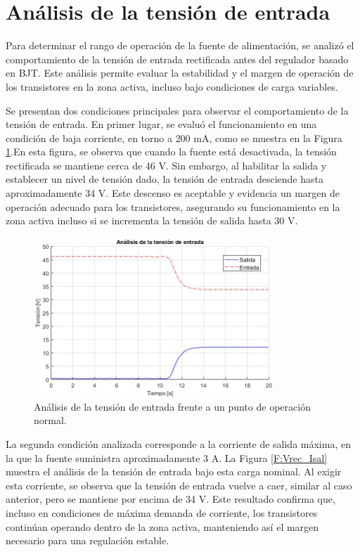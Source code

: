 \section{Análisis de la tensión de entrada}
Para determinar el rango de operación de la fuente de alimentación, se analizó el comportamiento de la tensión de entrada rectificada antes del regulador basado en BJT. Este análisis permite evaluar la estabilidad y el margen de operación de los transistores en la zona activa, incluso bajo condiciones de carga variables. \par

Se presentan dos condiciones principales para observar el comportamiento de la tensión de entrada. En primer lugar, se evaluó el funcionamiento en una condición de baja corriente, en torno a 200 mA, como se muestra en la Figura \ref{F:Tension_entrada_12}.En esta figura, se observa que cuando la fuente está desactivada, la tensión rectificada se mantiene cerca de 46 V. Sin embargo, al habilitar la salida y establecer un nivel de tensión dado, la tensión de entrada desciende hasta aproximadamente 34 V. Este descenso es aceptable y evidencia un margen de operación adecuado para los transistores, asegurando su funcionamiento en la zona activa incluso si se incrementa la tensión de salida hasta 30 V. \par

\begin{figure}[htbp]
    \centering
    \includegraphics[width=0.8\textwidth]{./imagenes/Tension_12.jpg}
    \caption{Análisis de la tensión de entrada frente a un punto de operación normal.}
    \label{F:Tension_entrada_12}
\end{figure}\par

La segunda condición analizada corresponde a la corriente de salida máxima, en la que la fuente suministra aproximadamente 3 A. La Figura \ref{F:Vrec_Isal} muestra el análisis de la tensión de entrada bajo esta carga nominal. Al exigir esta corriente, se observa que la tensión de entrada vuelve a caer, similar al caso anterior, pero se mantiene por encima de 34 V. Este resultado confirma que, incluso en condiciones de máxima demanda de corriente, los transistores continúan operando dentro de la zona activa, manteniendo así el margen necesario para una regulación estable. \par

